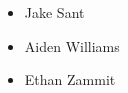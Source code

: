 \begin{itemize}

    \item Jake Sant

    \item Aiden Williams

    \item Ethan Zammit

\end{itemize}